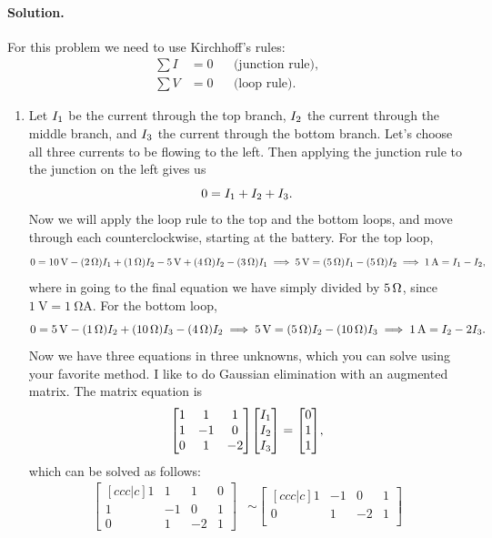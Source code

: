 \documentclass[11pt]{article}
\newcommand{\beq}{\begin{equation*}}
\newcommand{\eeq}{\end{equation*}}
\newenvironment{solution}
{
    \paragraph{Solution.}
    \ignorespaces
}
{
    \bigskip
}
\begin{document}
\begin{solution}
 	For this problem we need to use Kirchhoff's rules:
	\begin{align}
		\sum I &= 0 & &\text{(junction rule)}, \tag{26.5} \label{26.5} \\
		\sum V &= 0 & &\text{(loop rule)}. \tag{26.6} \label{26.6}
	\end{align}
	
	\begin{enumerate}
		\item Let $I_1$ be the current through the top branch, $I_2$ the current through the middle branch, and $I_3$ the current through the bottom branch.  Let's choose all three currents to be flowing to the left.  Then applying the junction rule to the junction on the left gives us
		\beq
			0 = \Iq + \Iw + \Ie.
		\eeq
		Now we will apply the loop rule to the top and the bottom loops, and move through each counterclockwise, starting at the battery.  For the top loop,
		\beq
			0 = \Svolt{10} - (\Sohm{2}) \Iq + (\Sohm{1}) \Iw - \Svolt{5} + (\Sohm{4}) \Iw - (\Sohm{3}) \Iq
			\implies
			\Svolt{5} = (\Sohm{5}) \Iq - (\Sohm{5}) \Iw
			\implies
			\Samp{1} = \Iq - \Iw,
		\eeq
		where in going to the final equation we have simply divided by $\SI{5}{\ohm}$, since $\SI{1}{\volt} = \SI{1}{\ohm\ampere}$.  For the bottom loop,
		\beq
			0 = \Svolt{5} - (\Sohm{1}) \Iw + (\Sohm{10}) \Ie - (\Sohm{4}) \Iw
			\implies
			\Svolt{5} = (\Sohm{5}) \Iw - (\Sohm{10}) \Ie
			\implies
			\Samp{1} = \Iw - 2 \Ie.
		\eeq
		Now we have three equations in three unknowns, which you can solve using your favorite method.  I like to do Gaussian elimination with an augmented matrix.  The matrix equation is
		\beq
			\mqty[ 1 & 1 & 1 \\
				1 & -1 & 0 \\
				0 & 1 & -2 ]
				\mqty[ \Iq \\ \Iw \\ \Ie ]
				= \mqty[ 0 \\ 1 \\ 1 ],
		\eeq
		which can be solved as follows:
		\begin{align*}
			\begin{bmatrix}[c c c | c]
				1 & 1 & 1 & 0 \\
				1 & -1 & 0 & 1 \\
				0 & 1 & -2 & 1
			\end{bmatrix}
			&\sim
			\begin{bmatrix}[c c c | c]
				1 & -1 & 0 & 1 \\
				0 & 1 & -2 & 1 \\

\end{bmatrix}
\end{align*}
\end{enumerate}
\end{solution}
\end{document}

